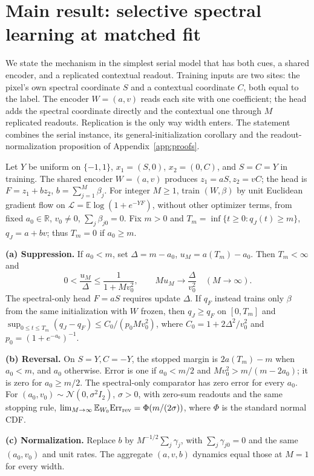 \section{Main result: selective spectral learning at matched fit}
\label{sec:theorem}

We state the mechanism in the simplest serial model that has both cues,
a shared encoder, and a replicated contextual readout. Training inputs are
two sites: the pixel's own spectral coordinate $S$ and a contextual
coordinate $C$, both equal to the label. The encoder $W=(a,v)$ reads each
site with one coefficient; the head adds the spectral coordinate directly
and the contextual one through $M$ replicated readouts. Replication is the
only way width enters. The statement combines the serial instance, its
general-initialization corollary and the readout-normalization proposition
of Appendix~\ref{app:proofs}.

\begin{theorem}\label{thm:serial}
Let $Y$ be uniform on $\{-1,1\}$, $x_1=(S,0)$, $x_2=(0,C)$,
and $S=C=Y$ in training. The shared encoder $W=(a,v)$ produces
$z_1=aS,z_2=vC$; the head is $F=z_1+bz_2$, $b=\sum_{j=1}^M\beta_j$.
For integer $M\ge1$, train $(W,\beta)$ by unit Euclidean gradient flow
on $\mathcal L=\mathbb E\log(1+e^{-YF})$, without other optimizer terms,
from fixed $a_0\in\mathbb R$, $v_0\ne0$, $\sum_j\beta_{j0}=0$.
Fix $m>0$ and $T_m=\inf\{t\ge0:q_J(t)\ge m\}$, $q_J=a+bv$;
thus $T_m=0$ if $a_0\ge m$.

\textbf{(a) Suppression.} If $a_0<m$, set $\Delta=m-a_0$,
$u_M=a(T_m)-a_0$. Then $T_m<\infty$ and
\[
 0<\frac{u_M}{\Delta}\le\frac1{1+Mv_0^2},
 \qquad Mu_M\longrightarrow\frac{\Delta}{v_0^2}\quad(M\to\infty).
\]
The spectral-only head $F=aS$ requires update $\Delta$.
If $q_F$ instead trains only $\beta$ from the same initialization with
$W$ frozen, then $q_J\ge q_F$ on $[0,T_m]$ and
$\sup_{0\le t\le T_m}(q_J-q_F)\le C_0/(p_0Mv_0^2)$,
where $C_0=1+2\Delta^2/v_0^2$ and $p_0=(1+e^{-a_0})^{-1}$.

\textbf{(b) Reversal.} On $S=Y,C=-Y$, the stopped margin is
$2a(T_m)-m$ when $a_0<m$, and $a_0$ otherwise.
Error is one if $a_0<m/2$ and $Mv_0^2>m/(m-2a_0)$;
it is zero for $a_0\ge m/2$. The spectral-only comparator has zero
error for every $a_0$.
For $(a_0,v_0)\sim\mathcal N(0,\sigma^2I_2)$, $\sigma>0$, with
zero-sum readouts and the same stopping rule,
$\lim_{M\to\infty}\mathbb E_{W_0}\mathrm{Err}_{\rm rev}
=\Phi(m/(2\sigma))$, where $\Phi$ is the standard normal CDF.

\textbf{(c) Normalization.} Replace $b$ by
$M^{-1/2}\sum_j\gamma_j$, with $\sum_j\gamma_{j0}=0$ and the same
$(a_0,v_0)$ and unit rates. The aggregate $(a,v,b)$ dynamics equal
those at $M=1$ for every width.
\end{theorem}

